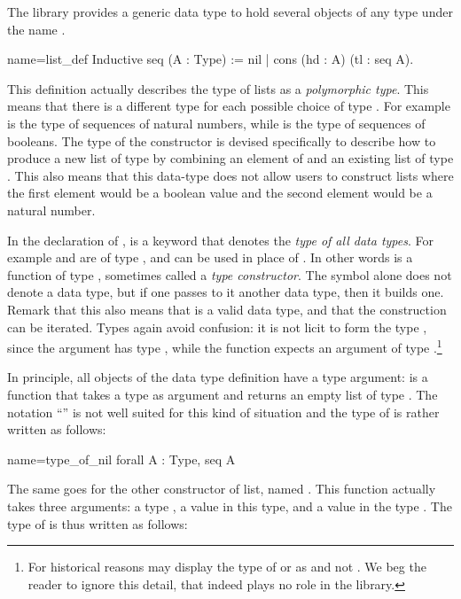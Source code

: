 The \mcbMC{} library provides a generic data type to hold
several objects of any type under the name .

\begin{coq}{name=list_def}{}
Inductive seq (A : Type) := nil | cons (hd : A) (tl : seq A).
\end{coq}
This definition actually describes the type of lists as a {\em
  polymorphic type}.  This means that there is a different type
 for each possible choice of type .  For example
 is the type of sequences of natural numbers, while
 is the type of sequences of booleans.
The type of the
constructor  is devised specifically to describe how to produce a
new list of type  by combining an element of  and an
existing list of type .  This also means that this data-type
does not allow users to construct lists where the first element would be
a boolean value and the second element would be a natural number.

In the declaration of ,  is a keyword that denotes the
\emph{type of all data types}.  For example  and  are of type
, and can be used in place of .
In other words  is a function of type , sometimes
called a \emph{type constructor}.  The symbol  alone does not
denote a data type,
but if one passes to it another data type, then it builds one.  Remark
that this also means that  is a valid data type, and
that the construction can be iterated.
Types again avoid confusion: it is not licit to form the type ,
since the argument  has type , while the function
 expects an argument of type .\footnote{For historical
reasons \Coq{} may display the type of  or  as 
and not .  We beg the reader to ignore this detail, that indeed
plays no role in the \mcbMC{} library.}

In principle, all objects of the data type definition have a type
argument:
 is a function that takes a type  as argument and returns
an empty list of type .  The notation ``'' is not
well suited for this kind of situation and the type of  is
rather written as follows:

\begin{coq}{name=type_of_nil}{}
  forall A : Type, seq A
\end{coq}
The same goes for the other constructor of list, named .  This
function actually takes three arguments: a type , a value in this
type, and a value in the type .  The type of  is
thus written as follows:


